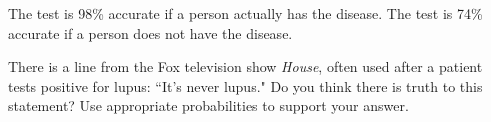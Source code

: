 \documentclass[10pt]{article}\usepackage[]{graphicx}\usepackage[]{color}
\newcommand{\ans}{\vspace{0.25in}}
\begin{document}
\begin{enumerate}
The test is 98\% accurate if a person actually has the disease. The test is 74\% accurate if a person does not have the disease. 

There is a line from the Fox television show \emph{House}, often used after a patient tests positive for lupus: ``It's never lupus." Do you think there is truth to this statement? Use appropriate probabilities to support your answer.

\ans


  
\end{enumerate}
%
%
%
%
%
%
%
%
%
%
\end{document}
